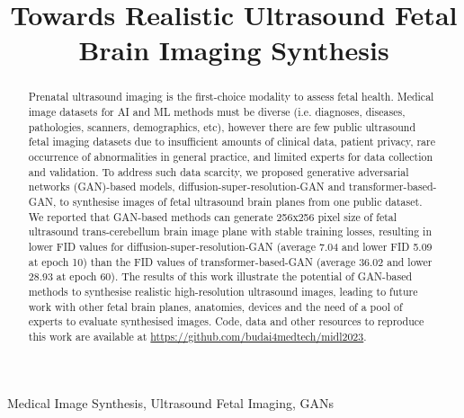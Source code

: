 \documentclass{midl} %
\title[
Towards Realistic High-Resolution Ultrasound Fetal Brain Imaging Synthesis %
]{
Towards Realistic Ultrasound Fetal Brain Imaging Synthesis %
}
\begin{document}
\maketitle

\begin{abstract}
Prenatal ultrasound imaging is the first-choice modality to assess fetal health.
Medical image datasets for AI and ML methods must be diverse (i.e. diagnoses, diseases, pathologies, scanners, demographics, etc), however there are few public ultrasound fetal imaging datasets due to insufficient amounts of clinical data, patient privacy, rare occurrence of abnormalities in general practice, and limited experts for data collection and validation.
To address such data scarcity, we proposed generative adversarial networks (GAN)-based models, diffusion-super-resolution-GAN and transformer-based-GAN, to synthesise images of fetal ultrasound brain planes from one public dataset.
We reported that GAN-based methods can generate 256x256 pixel size of fetal ultrasound trans-cerebellum brain image plane with stable training losses, resulting in lower FID values for diffusion-super-resolution-GAN (average 7.04 and lower FID 5.09 at epoch 10) than the FID values of transformer-based-GAN (average 36.02 and lower 28.93 at epoch 60).
The results of this work illustrate the potential of GAN-based methods to synthesise realistic high-resolution ultrasound images, leading to future work with other fetal brain planes, anatomies, devices and the need of a pool of experts to evaluate synthesised images.
Code, data and other resources to reproduce this work are available at \url{https://github.com/budai4medtech/midl2023}.
\end{abstract}

\begin{keywords}
Medical Image Synthesis, Ultrasound Fetal Imaging, GANs
\end{keywords}
\end{document}
